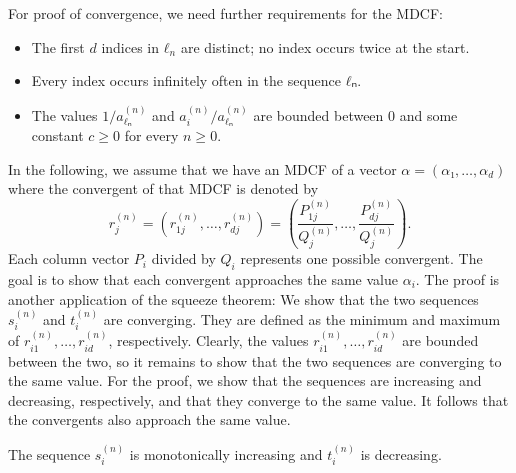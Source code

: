 For proof of convergence, we need further requirements for the MDCF:
\begin{itemize}
  \item The first $d$ indices in $ℓ_n$ are distinct; no index occurs twice at the start.
  \item Every index occurs infinitely often in the sequence $ℓₙ$.
  \item The values $1/a_{ℓₙ}^{(n)}$ and $a_i^{(n)}/a_{ℓₙ}^{(n)}$ are bounded
    between $0$ and some constant $c ≥ 0$ for every $n ≥ 0$.
\end{itemize}
In the following, we assume that we have an MDCF of a vector $α = (α₁, …, α_d)$
where the convergent of that MDCF is denoted by
\[
  r_j^{(n)} = (r_{1j}^{(n)}, …, r_{dj}^{(n)}) = \left(  \frac{P_{1j}^{(n)}}{Q_j^{(n)}}, \dots, \frac{P_{dj}^{(n)}}{Q_j^{(n)}} \right).
\]
Each column vector $P_i$ divided by $Q_i$ represents one possible convergent.
The goal is to show that each convergent approaches the same value $α_i$.
The proof is another application of the squeeze theorem:
We show that the two sequences $s_i^{(n)}$ and $t_i^{(n)}$ are converging.
They are defined as the minimum and maximum of $r_{i1}^{(n)}, …, r_{id}^{(n)}$, respectively.
Clearly, the values $r_{i1}^{(n)}, …, r_{id}^{(n)}$ are bounded between the two,
so it remains to show that the two sequences are converging to the same value.
For the proof, we show that the sequences are increasing and decreasing, respectively,
and that they converge to the same value.
It follows that the convergents also approach the same value.

\begin{lemma}
  The sequence $s_i^{(n)}$ is monotonically increasing and $t_i^{(n)}$ is decreasing.
\end{lemma}

